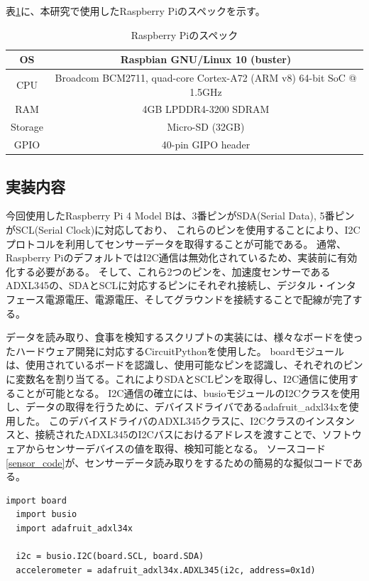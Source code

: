 表\ref{tb:raspberry_pi_spec}に、本研究で使用したRaspberry Piのスペックを示す。

\begin{table}[htbp]
  \caption{Raspberry Piのスペック}
  \label{tb:raspberry_pi_spec}
  \begin{center}
    \begin{tabular}{|c||c|}
      \hline
      OS  & Raspbian GNU/Linux 10 (buster) \\\hline
      CPU & Broadcom BCM2711, quad-core Cortex-A72 (ARM v8) 64-bit SoC @ 1.5GHz \\\hline
      RAM & 4GB LPDDR4-3200 SDRAM \\\hline
      Storage & Micro-SD (32GB) \\\hline
      GPIO & 40-pin GIPO header \\\hline
    \end{tabular}
  \end{center}
\end{table}

\subsection{実装内容}

今回使用したRaspberry Pi 4 Model Bは、3番ピンがSDA(Serial Data), 5番ピンがSCL(Serial Clock)に対応しており、
これらのピンを使用することにより、I2Cプロトコルを利用してセンサーデータを取得することが可能である。
通常、Raspberry PiのデフォルトではI2C通信は無効化されているため、実装前に有効化する必要がある。
そして、これら2つのピンを、加速度センサーであるADXL345の、SDAとSCLに対応するピンにそれぞれ接続し、デジタル・インタフェース電源電圧、電源電圧、そしてグラウンドを接続することで配線が完了する。\cite{adxl345_datasheet}

データを読み取り、食事を検知するスクリプトの実装には、様々なボードを使ったハードウェア開発に対応するCircuitPythonを使用した。
boardモジュールは、使用されているボードを認識し、使用可能なピンを認識し、それぞれのピンに変数名を割り当てる。これによりSDAとSCLピンを取得し、I2C通信に使用することが可能となる。
I2C通信の確立には、busioモジュールのI2Cクラスを使用し、データの取得を行うために、デバイスドライバであるadafruit\_adxl34xを使用した。
このデバイスドライバのADXL345クラスに、I2Cクラスのインスタンスと、接続されたADXL345のI2Cバスにおけるアドレスを渡すことで、ソフトウェアからセンサーデバイスの値を取得、検知可能となる。
ソースコード\ref{sensor_code}が、センサーデータ読み取りをするための簡易的な擬似コードである。

\begin{lstlisting}[caption=センサーデータを読み取るための疑似コード,label=sensor_code]
  import board
  import busio
  import adafruit_adxl34x

  i2c = busio.I2C(board.SCL, board.SDA)
  accelerometer = adafruit_adxl34x.ADXL345(i2c, address=0x1d)
\end{lstlisting}

